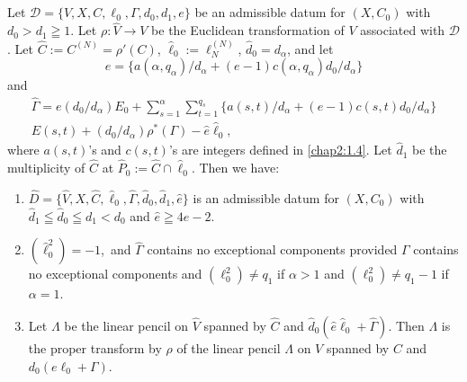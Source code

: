 \subsection{}\label{chap2:1.5}
\begin{lemma*}
  Let $\mathscr{D}=\{V,X,C,\ell_{0},\Gamma,d_{0},d_{1},e\}$ be an
  admissible datum for $(X,C_{0})$ with $d_{0}>d_{1}\geqq 1$. Let
  $\rho:\widehat{V}\to V$ be the Euclidean transformation of $V$
  associated with $\mathscr{D}$. Let $\widehat{C}:=C^{(N)}=\rho'(C)$,
  $\widehat{\ell}_{0}:=\ell^{(N)}_{N}$, $\widehat{d}_{0}=d_{\alpha}$,
  and let
  $$
  \widehat{e}=\{a(\alpha,q_{\alpha})/d_{\alpha}+(e-1)c(\alpha,q_{\alpha})
  d_{0}/d_{\alpha}\}   
  $$
  and
  \begin{multline*}
  \widehat{\Gamma}  =e(d_{0}/d_{\alpha})E_{0}+\sum^{\alpha}_{s=1}
  \sum^{q_{s}}_{t=1} \{a(s,t)/d_{\alpha}+(e-1)c(s,t)d_{0}/d_{\alpha}\}\\
  E(s,t)+(d_{0}/d_{\alpha})\rho^{\ast}(\Gamma)-\widehat{e}\widehat{\ell}_{0}, 
  \end{multline*}
  where $a(s,t)$'s and $c(s,t)$'s are integers defined in \ref{chap2:1.4}. Let
  $\widehat{d}_{1}$ be the multiplicity of $\widehat{C}$ at
  $\widehat{P}_{0}:=\widehat{C}\cap \widehat{\ell}_{0}$. Then we have:
  \begin{enumerate}
    \renewcommand{\labelenumi}{\rm(\theenumi)}
  \item
    $\widehat{D}=\{\widehat{V},X,\widehat{C},\widehat{\ell}_{0},
    \widehat{\Gamma},\widehat{d}_{0},\widehat{d}_{1},\widehat{e}\}$  
    is an admissible datum for $(X,C_{0})$ with $\widehat{d}_{1}\leqq
    \widehat{d}_{0}\leqq d_{1}<d_{0}$ and $\widehat{e}\geqq 4e-2$. 

  \item $(\widehat{\ell}^{2}_{0})=-1$,\pageoriginale\ and
    $\widehat{\Gamma}$ contains 
    no exceptional components provided $\Gamma$ contains no exceptional
    components and $(\ell^{2}_{0})\neq q_{1}$ if $\alpha>1$ and
    $(\ell^{2}_{0})\neq q_{1}-1$ if $\alpha=1$.
    
  \item Let $\Lambda$ be the linear pencil on $\widehat{V}$
    spanned by $\widehat{C}$ and
    $\widehat{d}_{0}(\widehat{e}\widehat{\ell}_{0}+\widehat{\Gamma})$. Then
    $\Lambda$ is the proper transform by $\rho$ of the linear
    pencil $\Lambda$ on $V$ spanned by $C$ and $d_{0}(e\ell_{0}+\Gamma)$.
  \end{enumerate}
\end{lemma*}

